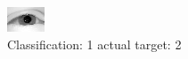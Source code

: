 \begin{figure}[h!]
\begin{center}
\includegraphics[width=0.60\columnwidth]{figures/ID2356_class_1_target_2.png}
\end{center}
\caption{ Classification: 1 actual target: 2}
\label{fig:ID2356_class_1_target_2}
\end{figure}
